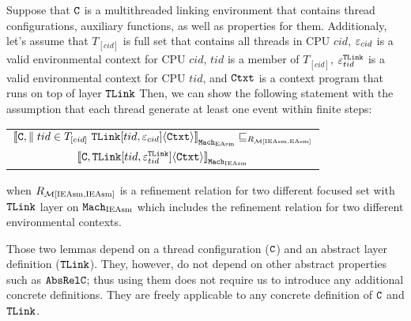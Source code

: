 \begin{lemma}
\label{lemma:chapter:conlink:easm-refines-single-ieasm}
Suppose that ${{\mathrm{\texttt{C}}}}$ is a multithreaded linking environment that contains thread configurations, auxiliary functions, as well as properties for them.
Additionaly, let's assume that  $T_{[cid]}$ is full set that contains all threads in CPU $cid$, 
 ${\varepsilon}_{cid}$ is a valid
environmental context for CPU $cid$,
$tid$ is a member of $T_{[cid]}$,
 ${\varepsilon}^{{{\mathrm{\texttt{TLink}}}}}_{tid}$ is a valid
environmental context for CPU $tid$,
and ${\mathrm{\texttt{Ctxt}}}$ is a
context program that runs on top of layer ${{\mathrm{\texttt{TLink}}}}$
 Then, we can show the following statement
 with the assumption that each thread generate at least one event within finite steps:
 \begin{center}
\begin{tabular}{c}
${[\![{{{\mathrm{\texttt{C}}}}, \parallel tid \in T_{[cid]} \  {{\mathrm{\texttt{TLink}}}}[tid, {\varepsilon}_{cid}]} \langle {{\mathrm{\texttt{Ctxt}}}} \rangle]\!]}_{{\mathrm{\texttt{Mach}}}_{\mathrm{EAsm}}} \sqsubseteq_{R_{\mathcal{M}{[\mathrm{IEAsm}, \mathrm{EAsm}]}}}$\\ 
${[\![{{{\mathrm{\texttt{C}}}}, {{\mathrm{\texttt{TLink}}}}[tid, {\varepsilon}^{{{\mathrm{\texttt{TLink}}}}}_{tid}]} \langle {{\mathrm{\texttt{Ctxt}}}} \rangle]\!]}_{{\mathrm{\texttt{Mach}}}_{\mathrm{IEAsm}}}$\\
\end{tabular}
\end{center}
when $R_{\mathcal{M}{[\mathrm{IEAsm}, \mathrm{IEAsm}]}}$ is a refinement relation for two different focused set with ${{\mathrm{\texttt{TLink}}}}$ layer on
${\mathrm{\texttt{Mach}}}_{\mathrm{IEAsm}}$ which includes the refinement relation for two different environmental contexts.
\end{lemma}

Those two lemmas depend on a thread configuration (${{\mathrm{\texttt{C}}}}$) and an abstract layer definition (${{\mathrm{\texttt{TLink}}}}$).
They, however, do not depend on other abstract properties such as ${{\mathrm{\texttt{AbsRelC}}}}$; thus
using them does not require us to introduce any additional concrete definitions. 
They are freely applicable to any concrete definition of ${{\mathrm{\texttt{C}}}}$ and ${{\mathrm{\texttt{TLink}}}}$. 


%
%
%


